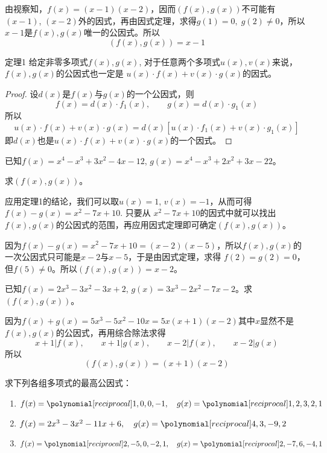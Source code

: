 \begin{solution}
由视察知，$f(x)=(x-1)(x-2)$，因而$(f(x),g(x))$不可能有$(x-1)$, $(x-2)$外的因式，再由因式定理，求得$g(1)=0,\; g(2)\ne 0$，所以$x-1$是$f(x), g(x)$唯一的公因式。所以
\[(f(x),g(x))=x-1\]
\end{solution}

\begin{blk}{定理1}
    给定非零多项式$f(x),g(x)$, 对于任意两个多项式$u(x),v(x)$来说，$f(x),g(x)$的公因式也一定是
$u(x)\cdot f(x)+v(x)\cdot g(x)$的因式。
\end{blk}

\begin{proof}
  设$d(x)$是$f(x)$与$g(x)$的一个公因式，则
\[f (x) =d (x) \cdot f_1 (x),\qquad  g(x)=d(x)\cdot g_1(x)\]
所以
\[u (x) \cdot f (x) +v (x) \cdot g (x) =d (x) [u (x) \cdot f_1 (x) +v (x) \cdot g_1 (x) ]\]
即$d(x)$也是$u(x)\cdot f(x)+v(x)\cdot g(x)$的一个因式。  
\end{proof}

\begin{example}
已知$f(x)=x^4-x^3+3x^2-4x-12$, $g(x)=x^4-x^3+2x^2+3x-22$。

求$(f(x),g(x))$。
\end{example}

\begin{analyze}
应用定理1的结论，我们可以取$u(x)=1$, $v(x)=-1$，从而可得 $f(x)-g(x)=x^2-7x+10$. 只要从 $x^2-7x+10$的因式中就可以找出$f(x),g(x)$的公因式的范围，再应用因式定理即可确定$(f(x),g(x))$。
\end{analyze}

\begin{solution}
因为$f(x)-g(x)=x^2-7x+10=(x-2)(x-5)$，所以$f(x),g(x)$的一次公因式只可能是$x-2$与$x-5$，于是由因式定理，求得
$f(2)=g(2)=0$，但$f(5)\ne 0$。所以$(f(x),g(x))=x-2$。
\end{solution}

\begin{example}
    已知$f(x)=2x^3-3x^2-3x+2$, $g(x)=3x^3-2x^2-7x-2$。求$(f(x),g(x))$。
\end{example}

\begin{solution}
    因为$f(x)+g(x)=5x^3-5x^2-10x=5x(x+1)(x-2)$其中$x$显然不是$f(x),g(x)$的公因式，再用综合除法求得
\[x+1|f(x),\qquad x+1|g(x),\qquad x-2|f(x),\qquad x-2|g(x)\]
所以
\[(f(x),g(x))=(x+1)(x-2)\]
\end{solution}

\begin{ex}
    求下列各组多项式的最高公因式：
\begin{enumerate}
    \item $f(x)=\poly{1,0,0,-1},\quad g(x)=\poly{1,2,3,2,1}$
    \item $f(x)=2x^3-3x^2-11x+6,\quad g(x)=\poly{4,3,-9,2}$
    \item $f(x)=\poly{2,-5,0,-2,1},\quad g(x)=\poly{2,-7,6,-4,1}$
\end{enumerate}
\end{ex}

